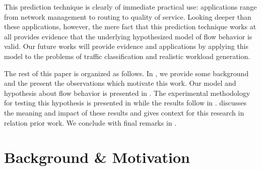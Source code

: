 \documentclass{acm_proc_article-sp}
\begin{document}
This prediction technique is clearly of immediate practical use:
applications range from network management to routing to quality of service.
Looking deeper than these applications, however, the mere fact that this prediction technique works at all provides evidence that the underlying hypothesized model of flow behavior is valid.
Our future works will provide evidence and applications by applying this model to the problems of traffic classification and realistic workload generation.

The rest of this paper is organized as follows.
In , we provide some background and the present the observations which motivate this work.
Our model and hypothesis about flow behavior is presented in .
The experimental methodology for testing this hypothesis is presented in  while the results follow in .
 discusses the meaning and impact of these results and gives context for this research in relation prior work.
We conclude with final remarks in .

\section{Background \& Motivation}
\end{document}
